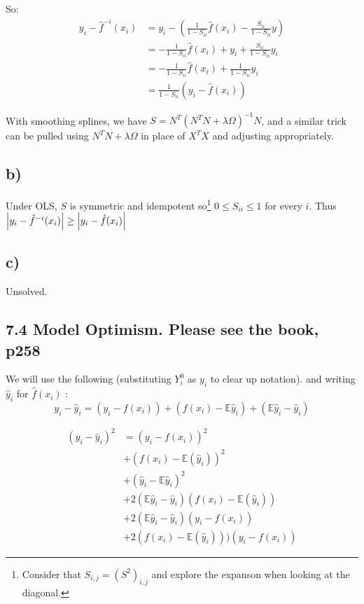 So:
\begin{align*}
y_i - \hat{f}^{-i}(x_i) &= y_i - \left(\frac{1}{1 - S_{ii}} \hat{f}(x_i) - \frac{S_{ii}}{1 - S_{ii}} y \right) \\
&= -\frac{1}{1 - S_{ii}} \hat{f}(x_i) + y_i + \frac{S_{ii}}{1 - S_{ii}} y_i \\
&= -\frac{1}{1 - S_{ii}} \hat{f}(x_i) + \frac{1}{1 - S_{ii}} y_i\\
&=  \frac{1}{1 - S_{ii}} \left(y_i - \hat{f}(x_i)\right)
\end{align*}

With smoothing splines, we have $S = N^T(N^T N + \lambda \Omega)^{-1} N$, and a similar trick can be pulled using $N^T N + \lambda \Omega$ in place of $X^T X$ and adjusting appropriately.

\subsection*{b)}

Under OLS, $S$ is symmetric and idempotent so\footnote{Consider that $S_{i,j} = (S^2)_{i,j}$ and explore the expanson when looking at the diagonal.} $0 \leq S_{ii} \leq 1$ for every $i$.
Thus $\left\vert y_i - \hat{f}^{-i}(x_i)\right\vert \geq \left\vert y_i - \hat{f}(x_i)\right\vert$



\subsection*{c)}
Unsolved.

\subsection*{7.4 Model Optimism. Please see the book, p258}

We will use the following (substituting $Y_i^0$ as $y_i$ to clear up notation). and writing $\hat{y}_i$ for $\hat{f}(x_i)$ :
$$ y_i - \hat{y}_i = (y_i - f(x_i)) + (f(x_i) - \mathbb{E}\hat{y}_i)  + (\mathbb{E}\hat{y}_i - \hat{y}_i)$$

\begin{align}
    (y_i - \hat{y}_i)^2 &=  (y_i - f(x_i))^2\\
    & +  (f(x_i) - \mathbb{E}(\hat{y}_i))^2\\
    & +  ( \hat{y}_i - \mathbb{E}\hat{y}_i)^2\\
   & +  2  (  \mathbb{E}\hat{y}_i - \hat{y}_i) (f(x_i) - \mathbb{E}(\hat{y}_i))\\
   & +  2  (  \mathbb{E}\hat{y}_i - \hat{y}_i)  (y_i - f(x_i))\\
   & +  2  (f(x_i) - \mathbb{E}(\hat{y}_i)) ) (y_i - f(x_i))
\end{align}

